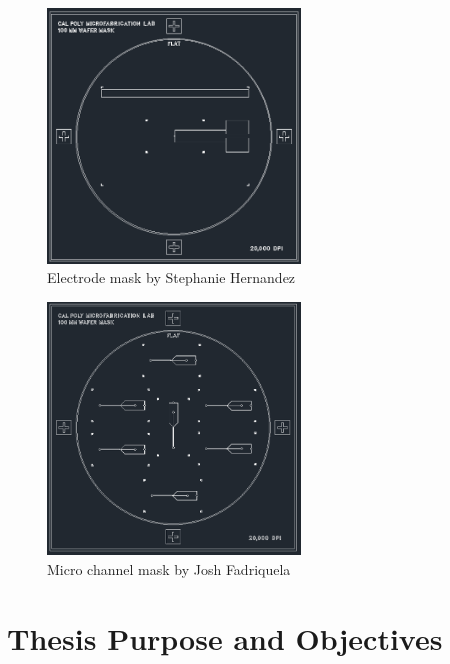 \begin{figure}[h]
    \centering
    \includegraphics[width=0.6\textwidth]{images/electrode_mask.png}
    \caption{Electrode mask by Stephanie Hernandez \cite{hernandez_single_2009-1}}
    \label{fig:electrode_mask}
\end{figure}

\begin{figure}[h]
    \centering
    \includegraphics[width=0.6\textwidth]{images/micro_channel_mask.png}
    \caption{Micro channel mask by Josh Fadriquela \cite{fadriquela_design_2009-1}}
    \label{fig:microchannel_mask}
\end{figure}

\section[Objectives]{Thesis Purpose and Objectives}